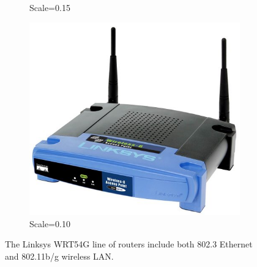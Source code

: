 \documentclass[a4paper,11pt]{article}
\begin{document}
\begin{figure}[hbp]
\begin{subfigure}[b]{0.3\textwidth}
		\caption{Scale=0.15}	
	\end{subfigure}
	\begin{subfigure}[b]{0.3\textwidth}
		\centering		
		\includegraphics[scale=0.10]{linksys}
		\caption{Scale=0.10}
	\end{subfigure}
	\caption{The Linksys WRT54G line of routers include both  802.3 Ethernet and 802.11b/g wireless LAN.}
	\label{fig:linksys}
\end{figure}


\label{sec:references}



%
%
%
\end{document}
